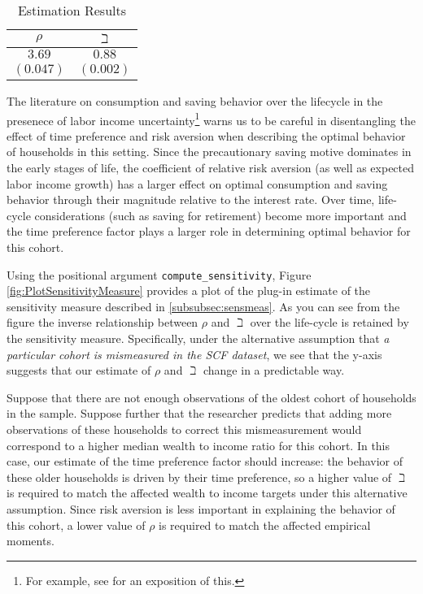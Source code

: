 \documentclass[titlepage, headings=optiontotocandhead]{Resources/texmf-local/tex/latex/econtex}
\begin{document}
  \begin{table}[h]
    \caption{Estimation Results}\label{tab:EstResults}
    \center
    \begin{tabular}{cc}
      \hline
      $\rho $ & $\beth$\\
      \hline
      $3.69$ & $0.88$\\
      $(0.047)$ & $(0.002)$\\
      \hline
    \end{tabular}
  \end{table}

The literature on consumption and saving behavior over the lifecycle in the presenece of labor income uncertainty\footnote{For example, see \cite{gpLifecycle} for an exposition of this.} warns us to be careful in disentangling the effect of time preference and risk aversion when describing the optimal behavior of households in this setting.  Since the precautionary saving motive dominates in the early stages of life, the coefficient of relative risk aversion (as well as expected labor income growth) has a larger effect on optimal consumption and saving behavior through their magnitude relative to the interest rate. Over time, life-cycle considerations (such as saving for retirement) become more important and the time preference factor plays a larger role in determining optimal behavior for this cohort.

Using the positional argument \texttt{compute\_sensitivity}, Figure \ref{fig:PlotSensitivityMeasure} provides a plot of the plug-in estimate of the sensitivity measure described in \ref{subsubsec:sensmeas}. As you can see from the figure the inverse relationship between $\rho$ and $\beth$ over the life-cycle is retained by the sensitivity measure. Specifically, under the alternative assumption that \textit{a particular cohort is mismeasured in the SCF dataset}, we see that the y-axis suggests that our estimate of $\rho$ and $\beth$ change in a predictable way.

Suppose that there are not enough observations of the oldest cohort of households in the sample. Suppose further that the researcher predicts that adding more observations of these households to correct this mismeasurement would correspond to a higher median wealth to income ratio for this cohort. In this case, our estimate of the time preference factor should increase: the behavior of these older households is driven by their time preference, so a higher value of $\beth$ is required to match the affected wealth to income targets under this alternative assumption. Since risk aversion is less important in explaining the behavior of this cohort, a lower value of $\rho$ is required to match the affected empirical moments.
\end{document}
